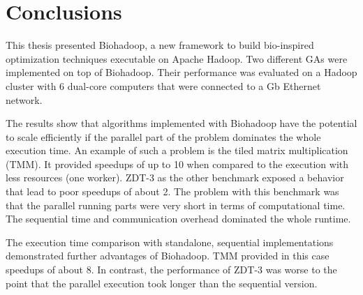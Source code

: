 \chapter{Conclusions}
\label{chap:conclusions}
This thesis presented Biohadoop, a new framework to build bio-inspired optimization techniques executable on Apache Hadoop. Two different GAs were implemented on top of Biohadoop. Their performance was evaluated on a Hadoop cluster with 6 dual-core computers that were connected to a \unit[1]{Gb} Ethernet network.

The results show that algorithms implemented with Biohadoop have the potential to scale efficiently if the parallel part of the problem dominates the whole execution time. An example of such a problem is the tiled matrix multiplication (TMM). It provided speedups of up to 10 when compared to the execution with less resources (one worker). ZDT-3 as the other benchmark exposed a behavior that lead to poor speedups of about 2. The problem with this benchmark was that the parallel running parts were very short in terms of computational time. The sequential time and communication overhead dominated the whole runtime.

The execution time comparison with standalone, sequential implementations demonstrated further advantages of Biohadoop. TMM provided in this case speedups of about 8. In contrast, the performance of ZDT-3 was worse to the point that the parallel execution took longer than the sequential version.


